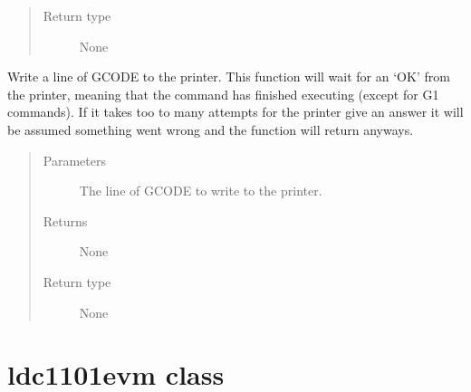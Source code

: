 \documentclass[letterpaper,10pt,english]{sphinxmanual}
\begin{document}
\begin{fulllineitems}
\begin{fulllineitems}
\begin{quote}
\begin{description}
\item[{Return type}] \leavevmode
\sphinxAtStartPar
None

\end{description}\end{quote}

\end{fulllineitems}


\begin{fulllineitems}
\label{\detokenize{index:diabase.diabase.write_line}}
\sphinxAtStartPar
Write a line of GCODE to the printer. This function will wait for an ‘OK’ from the printer, meaning that the command has finished executing (except for G1 commands). If it takes too to many attempts for the printer give an answer it will be assumed something went wrong and the function will return anyways.
\begin{quote}\begin{description}
\item[{Parameters}] \leavevmode
\sphinxAtStartPar
{} \textendash{} The line of GCODE to write to the printer.

\item[{Returns}] \leavevmode
\sphinxAtStartPar
None

\item[{Return type}] \leavevmode
\sphinxAtStartPar
None

\end{description}\end{quote}

\end{fulllineitems}


\end{fulllineitems}



\chapter{ldc1101evm class}
\label{\detokenize{index:ldc1101evm-class}}\label{\detokenize{index:module-ldc1101evm}}\label{\detokenize{index:module-2}}
\end{document}
